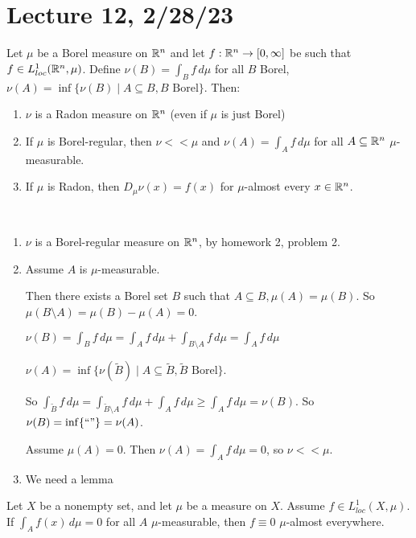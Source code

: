 \documentclass[x11names,reqno,14pt]{extarticle}
\newcommand{\Dmn}{D_\mu\nu}
\newcommand{\loc}{loc}
\begin{document}
\section*{Lecture 12, 2/28/23}

\lem Let $\mu$ be a Borel measure on $\mathbb{R}^n$ and let $f:\mathbb{R}^n\to[0,\infty]$ be such that $f\in L^1_{\loc}(\R^n,\mu)$. Define $\nu(B) = \int_Bf\,d\mu$ for all $B$ Borel, $\nu(A) = \inf\{\nu(B)\mid A \subseteq B, B \text{ Borel}\}$. Then:
\begin{enumerate}

\item $\nu$ is a Radon measure on $\mathbb{R}^n$ (even if $\mu$ is just Borel)
\item If $\mu$ is Borel-regular, then $\nu<<\mu$ and $\nu(A) = \int_Af\,d\mu$ for all $A \subseteq\mathbb{R}^n$ $\mu$-measurable.
\item If $\mu$ is Radon, then $\Dmn(x) = f(x)$ for $\mu$-almost every $x \in \mathbb{R}^n$. 

\end{enumerate}

\proof\,

\begin{enumerate}

\item $\nu$ is a Borel-regular measure on $\mathbb{R}^n$, by homework 2, problem 2. 

\item Assume $A$ is $\mu$-measurable. 

Then there exists a Borel set $B$ such that $A \subseteq B, \mu(A) = \mu(B)$. So $\mu(B\setminus A) = \mu(B) - \mu(A) = 0$. 

$\nu(B) = \int_Bf\,d\mu = \int_Af\,d\mu + \int_{B\setminus A}f\,d\mu = \int_Af\,d\mu$

$\nu(A) = \inf\{\nu(\tilde{B})\mid A\subseteq\tilde{B}, \tilde{B} \text{ Borel}\}$. 

So $\int_{\tilde{B}}f\,d\mu = \int_{\tilde{B}\setminus A}f\,d\mu + \int_Af\,d\mu \geq \int_Af\,d\mu = \nu(B)$. So $\nu(B) = \inf\{``"\} = \nu(A)$. 

Assume $\mu(A) = 0$. Then $\nu(A) = \int_Af\,d\mu = 0$, so $\nu<<\mu$. 

\item We need a lemma


\end{enumerate}

\lem 

Let $X$ be a nonempty set, and let $\mu$ be a measure on $X$. Assume $f \in L^1_{\loc}(X,\mu)$. If $\int_Af(x)\,d\mu = 0$ for all $A$ $\mu$-measurable, then $f \equiv 0$ $\mu$-almost everywhere. 
\end{document}
